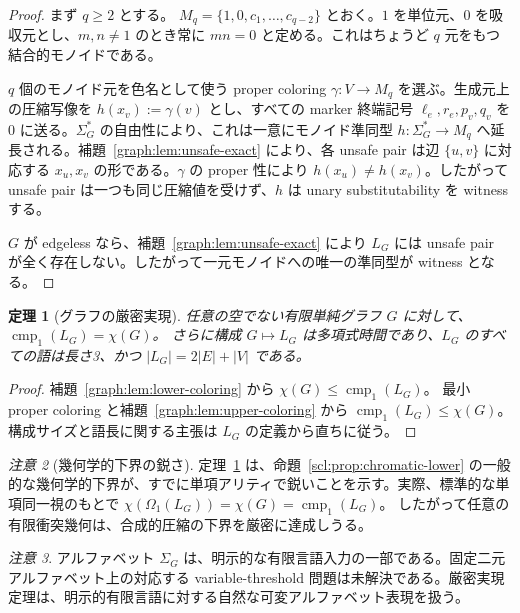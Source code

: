 \documentclass[10pt,a4paper]{ltjsarticle}
\newtheorem{theorem}{定理}[section]
\theoremstyle{definition}
\theoremstyle{remark}
\newtheorem{remark}[theorem]{注意}
\newcommand{\cmp}{\operatorname{cmp}}
\newcommand{\Om}{\Omega}
\begin{document}
\begin{proof}
まず $q\ge2$ とする。
\(M_q=\{1,0,c_1,\ldots,c_{q-2}\}\)
とおく。$1$ を単位元、$0$ を吸収元とし、$m,n\neq1$ のとき常に $mn=0$ と定める。これはちょうど $q$ 元をもつ結合的モノイドである。

$q$ 個のモノイド元を色名として使う proper coloring
\(\gamma:V\to M_q\)
を選ぶ。生成元上の圧縮写像を
\(h(x_v):=\gamma(v)\)
とし、すべての marker 終端記号 $\ell_e,r_e,p_v,q_v$ を $0$ に送る。$\Sigma_G^*$ の自由性により、これは一意にモノイド準同型
\(h:\Sigma_G^*\to M_q\)
へ延長される。補題~\ref{graph:lem:unsafe-exact} により、各 unsafe pair は辺 $\{u,v\}$ に対応する $x_u,x_v$ の形である。$\gamma$ の proper 性により $h(x_u)\neq h(x_v)$。したがって unsafe pair は一つも同じ圧縮値を受けず、$h$ は unary substitutability を witness する。

$G$ が edgeless なら、補題~\ref{graph:lem:unsafe-exact} により $L_G$ には unsafe pair が全く存在しない。したがって一元モノイドへの唯一の準同型が witness となる。
\end{proof}

\begin{theorem}[グラフの厳密実現]
\label{graph:thm:graph-realization}
任意の空でない有限単純グラフ \(G\) に対して、
\(\cmp_1(L_G)=\chi(G)\)。
さらに構成 \(G\mapsto L_G\) は多項式時間であり、$L_G$ のすべての語は長さ3、かつ
\(|L_G|=2|E|+|V|\)
である。
\end{theorem}

\begin{proof}
補題~\ref{graph:lem:lower-coloring} から
\(\chi(G)\le\cmp_1(L_G)\)。
最小 proper coloring と補題~\ref{graph:lem:upper-coloring} から
\(\cmp_1(L_G)\le\chi(G)\)。
構成サイズと語長に関する主張は $L_G$ の定義から直ちに従う。
\end{proof}

\begin{remark}[幾何学的下界の鋭さ]
定理~\ref{graph:thm:graph-realization} は、命題~\ref{scl:prop:chromatic-lower} の一般的な幾何学的下界が、すでに単項アリティで鋭いことを示す。実際、標準的な単項同一視のもとで
\(\chi(\Om_1(L_G))=\chi(G)=\cmp_1(L_G)\)。
したがって任意の有限衝突幾何は、合成的圧縮の下界を厳密に達成しうる。
\end{remark}

\begin{remark}
アルファベット \(\Sigma_G\) は、明示的な有限言語入力の一部である。固定二元アルファベット上の対応する variable-threshold 問題は未解決である。厳密実現定理は、明示的有限言語に対する自然な可変アルファベット表現を扱う。
\end{remark}
\end{document}
